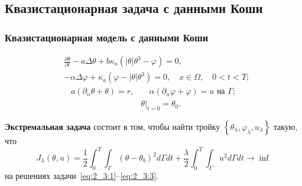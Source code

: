 \subsection{Квазистационарная задача с данными Коши}\label{subsec:qst_koshi}
\begin{frame}
    \frametitle{Квазистационарная модель с данными Коши}
    \begin{equation}
        \label{eq:2_3:1}
        \begin{split}
            & \frac{\partial \theta}{\partial t} - a \Delta \theta
            + b \kappa_{a} \left(|\theta| \theta^{3}-\varphi\right) = 0,\\
            & - \alpha \Delta \varphi
            + \kappa_{a} \left(\varphi-|\theta| \theta^{3}\right) = 0,
            \quad x \in \Omega, \quad 0 < t < T;
        \end{split}
    \end{equation}
    \begin{align}
        a \left(\partial_{n} \theta+\theta\right)=r,
        & \quad \alpha\left(\partial_{n} \varphi
        + \varphi\right) = u \text { на } \Gamma;  \label{eq:2_3:2}\\
        & \left.\theta\right|_{t=0} = \theta_{0}. \label{eq:2_3:3}
    \end{align}


    \textbf{Экстремальная задача} состоит в том, чтобы найти тройку
    $\left\{\theta_{\lambda}, \varphi_{\lambda}, u_{\lambda}\right\}$ такую, что
    \begin{equation}
        \label{eq:2_3:4}
        J_{\lambda}(\theta, u)=\frac{1}{2} \int_{0}^{T}
        \int_{\Gamma}\left(\theta-\theta_{b}\right)^{2} d \Gamma d t+\frac{\lambda}{2}
        \int_{0}^{T} \int_{\Gamma} u^{2} d \Gamma d t \rightarrow \inf
    \end{equation}
    на решениях задачи~\eqref{eq:2_3:1}--\eqref{eq:2_3:3}.
\end{frame}


